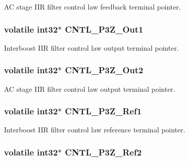 A\-C stage I\-I\-R filter control law feedback terminal pointer. \hypertarget{a00009_acb0edbb1cfd2fb0e63ac2eb233dcd577}{
\subsubsection[{C\-N\-T\-L\-\_\-3\-P3\-Z\-\_\-\-Out1}]{\setlength{\rightskip}{0pt plus 5cm}volatile int32$\ast$ C\-N\-T\-L\-\_\-P3\-Z\-\_\-\-Out1}}\label{a00009_acb0edbb1cfd2fb0e63ac2eb233dcd577}
Interboost I\-I\-R filter control law output terminal pointer. \hypertarget{a00009_a92dd8eabeed10eaaaf60887d9bcbd76d}{
\subsubsection[{C\-N\-T\-L\-\_\-3\-P3\-Z\-\_\-\-Out2}]{\setlength{\rightskip}{0pt plus 5cm}volatile int32$\ast$ C\-N\-T\-L\-\_\-P3\-Z\-\_\-\-Out2}}\label{a00009_a92dd8eabeed10eaaaf60887d9bcbd76d}
A\-C stage I\-I\-R filter control law output terminal pointer. \hypertarget{a00009_a6ebe91dab023eff56cade0eddcd3e96d}{
\subsubsection[{C\-N\-T\-L\-\_\-3\-P3\-Z\-\_\-\-Ref1}]{\setlength{\rightskip}{0pt plus 5cm}volatile int32$\ast$ C\-N\-T\-L\-\_\-P3\-Z\-\_\-\-Ref1}}\label{a00009_a6ebe91dab023eff56cade0eddcd3e96d}
Interboost I\-I\-R filter control law reference terminal pointer. \hypertarget{a00009_a589e93bad0b8ba223e32ce590bba816b}{
\subsubsection[{C\-N\-T\-L\-\_\-3\-P3\-Z\-\_\-\-Ref2}]{\setlength{\rightskip}{0pt plus 5cm}volatile int32$\ast$ C\-N\-T\-L\-\_\-P3\-Z\-\_\-\-Ref2}}\label{a00009_a589e93bad0b8ba223e32ce590bba816b}
